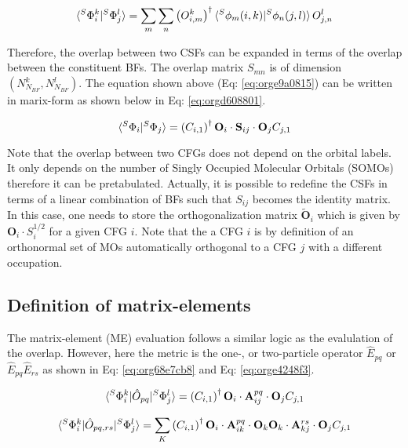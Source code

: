 \documentclass[11pt]{article}
\begin{document}
\begin{equation}
\label{eq:orge9a0815}
\braket{^S\Phi^k_i|^S\Phi^l_j} = \sum_m \sum_n \left( O^k_{i,m}\right)^{\dagger} \braket{^S\phi_m(i,k)|^S\phi_n(j,l)} O^l_{j,n}
\end{equation}


Therefore, the overlap between two CSFs can be expanded in terms of the overlap
between the constituent BFs. The overlap matrix \(S_{mn}\) is of dimension \(\left( N^k_{N_{BF}} , N^l_{N_{BF}} \right)\).
The equation shown above (Eq: \ref{eq:orge9a0815}) can be written in marix-form as
shown below in Eq: \ref{eq:orgd608801}.

\begin{equation}
\label{eq:orgd608801}
\braket{^S\Phi_i|^S\Phi_j} = \left( C_{i,1} \right)^{\dagger} \mathbf{O}_i\cdot\mathbf{S}_{ij}\cdot\mathbf{O}_j C_{j,1}
\end{equation}


Note that the overlap between two CFGs does not depend on the orbital
labels. It only depends on the number of Singly Occupied Molecular Orbitals
(SOMOs) therefore it can be pretabulated. Actually, it is possible to
redefine the CSFs in terms of a linear combination of BFs such that
\(S_{ij}\) becomes the identity matrix. In this case, one needs to store the
orthogonalization matrix \(\mathbf{\tilde{O}}_i\) which is given by
\(\mathbf{O}_i\cdot S^{1/2}_i\) for a given CFG \(i\). Note that the a CFG
\(i\) is by definition of an orthonormal set of MOs automatically orthogonal
to a CFG \(j\) with a different occupation.

\subsection{Definition of matrix-elements}
\label{sec:org4e0679d}

The matrix-element (ME) evaluation follows a similar logic as the evalulation of
the overlap. However, here the metric is the one-, or two-particle operator \(\hat{E}_{pq}\)
or \(\hat{E}_{pq}\hat{E}_{rs}\) as shown in Eq: \ref{eq:org68e7cb8} and Eq: \ref{eq:orge4248f3}.

\begin{equation}
\label{eq:org68e7cb8}
\braket{^S\Phi^k_i|\hat{O}_{pq}|^S\Phi^l_j} = \left( C_{i,1} \right)^{\dagger} \mathbf{O}_i\cdot\mathbf{A}^{pq}_{ij}\cdot\mathbf{O}_j C_{j,1}
\end{equation}

\begin{equation}
\label{eq:orge4248f3}
\braket{^S\Phi^k_i|\hat{O}_{pq,rs}|^S\Phi^l_j} = \sum_K \left( C_{i,1} \right)^{\dagger} \mathbf{O}_i\cdot\mathbf{A}^{pq}_{ik}\cdot\mathbf{O}_k \mathbf{O}_k\cdot\mathbf{A}^{rs}_{kj}\cdot\mathbf{O}_j  C_{j,1}
\end{equation}
\end{document}
